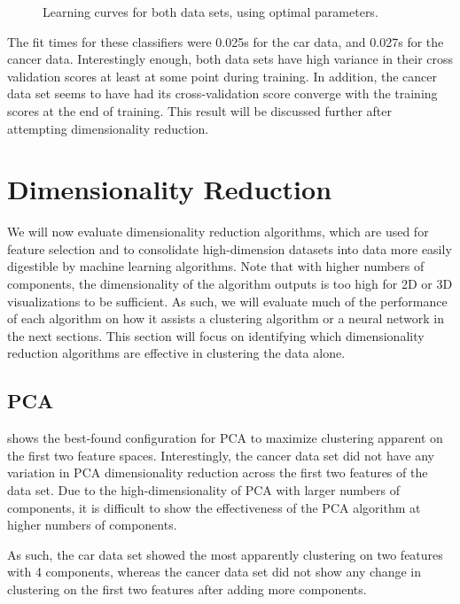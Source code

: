 \documentclass{article}
\begin{document}
\begin{figure}[htb]
        \caption{Learning curves for both data sets, using optimal parameters.}
        \label{fig:em-learning}
        \end{figure}

        The fit times for these classifiers were 0.025s for the car data, and 0.027s for the cancer data. Interestingly enough, both data sets have high variance in their cross validation scores at least at some point during training. In addition, the cancer data set seems to have had its cross-validation score converge with the training scores at the end of training. This result will be discussed further after attempting dimensionality reduction.

  \section{Dimensionality Reduction}
    We will now evaluate dimensionality reduction algorithms, which are used for feature selection and to consolidate high-dimension datasets into data more easily digestible by machine learning algorithms. Note that with higher numbers of components, the dimensionality of the algorithm outputs is too high for 2D or 3D visualizations to be sufficient. As such, we will evaluate much of the performance of each algorithm on how it assists a clustering algorithm or a neural network in the next sections. This section will focus on identifying which dimensionality reduction algorithms are effective in clustering the data alone. 

    \subsection{PCA}
       shows the best-found configuration for PCA to maximize clustering apparent on the first two feature spaces. Interestingly, the cancer data set did not have any variation in PCA dimensionality reduction across the first two features of the data set. Due to the high-dimensionality of PCA with larger numbers of components, it is difficult to show the effectiveness of the PCA algorithm at higher numbers of components.

      As such, the car data set showed the most apparently clustering on two features with 4 components, whereas the cancer data set did not show any change in clustering on the first two features after adding more components.
\end{document}

